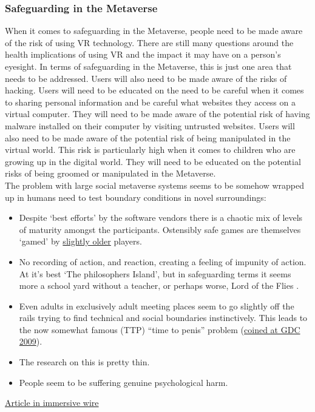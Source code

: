 \subsubsection{Safeguarding in the Metaverse}
When it comes to safeguarding in the Metaverse, people need to be made aware of the risk of using VR technology. There are still many questions around the health implications of using VR and the impact it may have on a person’s eyesight. In terms of safeguarding in the Metaverse, this is just one area that needs to be addressed. Users will also need to be made aware of the risks of hacking. Users will need to be educated on the need to be careful when it comes to sharing personal information and be careful what websites they access on a virtual computer. They will need to be made aware of the potential risk of having malware installed on their computer by visiting untrusted websites. Users will also need to be made aware of the potential risk of being manipulated in the virtual world. This risk is particularly high when it comes to children who are growing up in the digital world. They will need to be educated on the potential risks of being groomed or manipulated in the Metaverse.\\

The problem with large social metaverse systems seems to be somehow wrapped up in humans need to test boundary conditions in novel surroundings:
\begin{itemize}
\item Despite `best efforts' by the software vendors  there is a chaotic mix of levels of maturity amongst the participants. Ostensibly safe games are themselves `gamed' by \href{https://futurism.com/mom-horrified-her-kids-seeing-roblox}{slightly older} players.
\item No recording of action, and reaction, creating a feeling of impunity of action. At it's best `The philosophers Island', but in safeguarding terms it seems more a school yard without a teacher, or perhaps worse, Lord of the Flies \cite{cameron2012splendid}.
\item Even adults in exclusively adult meeting places seem to go slightly off the rails trying to find technical and social boundaries instinctively. This leads to the now somewhat famous (TTP) ``time to penis'' problem \cite{lamb2022second} (\href{http://gamedesignreviews.com/reviews/little-big-planet-browsing-content/}{coined at GDC 2009}). 
\item The research on this is pretty thin.
\item People seem to be suffering genuine psychological harm.
\end{itemize}
\href{https://www.immersivewire.com/p/harassment-metaverse-how-address}{Article in immersive wire}
